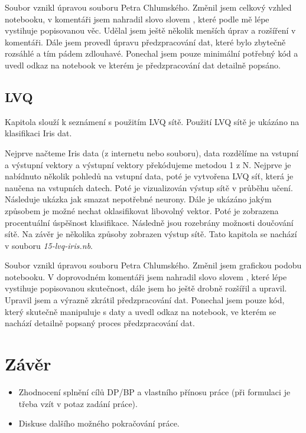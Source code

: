 \documentclass[11pt,twoside,a4paper]{book}
\begin{document}
Soubor vznikl úpravou souboru Petra Chlumského. Změnil jsem celkový vzhled notebooku, v komentáři jsem nahradil slovo  slovem , které podle mě lépe vystihuje popisovanou věc. Udělal jsem ještě několik menších úprav a rozšíření v komentáři. Dále jsem provedl úpravu předzpracování dat, které bylo zbytečně rozsáhlé a tím pádem zdlouhavé. Ponechal jsem pouze minimální potřebný kód a uvedl odkaz na notebook ve kterém je předzpracování dat detailně popsáno.
\section{LVQ}
Kapitola slouží k seznámení s použitím LVQ sítě. Použití LVQ sítě je ukázáno na klasifikaci Iris dat.

Nejprve načteme Iris data (z internetu nebo souboru), data rozdělíme na vstupní a výstupní vektory a výstupní vektory překódujeme metodou 1 z N. Nejprve je nabídnuto několik pohledů na vstupní data, poté je vytvořena LVQ síť, která je naučena na vstupních datech. Poté je vizualizován výstup sítě v průběhu učení. Následuje ukázka jak smazat nepotřebné neurony. Dále je ukázáno jakým způsobem je možné nechat oklasifikovat libovolný vektor. Poté je zobrazena procentuální úspěšnost klasifikace. Následně jsou rozebrány možnosti doučování sítě. Na závěr je několika způsoby zobrazen výstup sítě.
Tato kapitola se nachází v souboru \textit{15-lvq-iris.nb}.

Soubor vznikl úpravou souboru Petra Chlumského. Změnil jsem grafickou podobu notebooku. V doprovodném komentáři jsem nahradil slovo  slovem , které lépe vystihuje popisovanou skutečnost, dále jsem ho ještě drobně rozšířil a upravil. Upravil jsem a výrazně zkrátil předzpracování dat. Ponechal jsem pouze kód, který skutečně manipuluje s daty a uvedl odkaz na notebook, ve kterém se nachází detailně popsaný proces předzpracování dat. 
\chapter{Závěr}

\begin{itemize}
\item Zhodnocení splnění cílů DP/BP a  vlastního přínosu práce (při formulaci je třeba vzít v potaz zadání práce).
\item Diskuse dalšího možného pokračování práce.
\end{itemize} 
\end{document}

